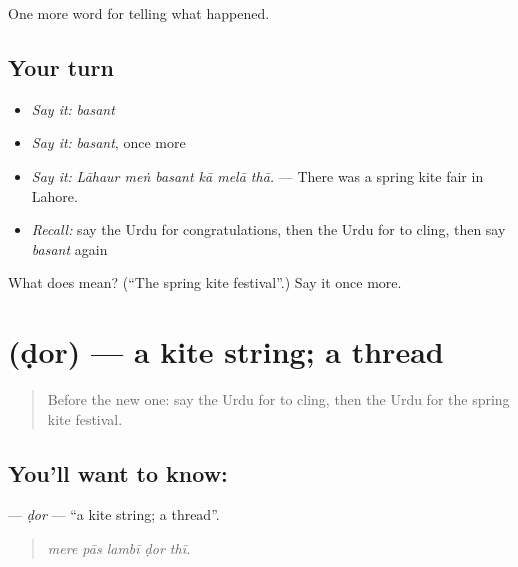 \begin{grammarlens}[title={What you've built}]
One more word for telling what happened.
\end{grammarlens}

\subsection*{Your turn}
\begin{itemize}
\raggedright
  \item \emph{Say it:} \emph{basant}
  \item \emph{Say it:} \emph{basant}, once more
  \item \emph{Say it:} \emph{Lāhaur meṅ basant kā melā thā.} — There was a spring kite fair in Lahore.
  \item \emph{Recall:} say the Urdu for congratulations, then the Urdu for to cling, then say \emph{basant} again
\end{itemize}

\begin{tcolorbox}[breakable,colback=teal!4,colframe=teal!35!black,title={Before you move on}]
What does  mean? (\textquotedblleft{}The spring kite festival\textquotedblright{}.) Say it once more.
\end{tcolorbox}
\section[\texorpdfstring{\ur{ڈور} (ḍor)}{ڈور (ḍor)}]{ (ḍor) — a kite string; a thread}

\label{lesson:UR-C319-dor}



\begin{quote}
Before the new one: say the Urdu for to cling, then the Urdu for the spring kite festival.
\end{quote}

\subsection*{You'll want to know: }
\textbf{} — \emph{ḍor} — \textquotedblleft{}a kite string; a thread\textquotedblright{}.

\begin{quote}
    
\end{quote}

\begin{quote}
\emph{mere pās lambī ḍor thī.}
\end{quote}


